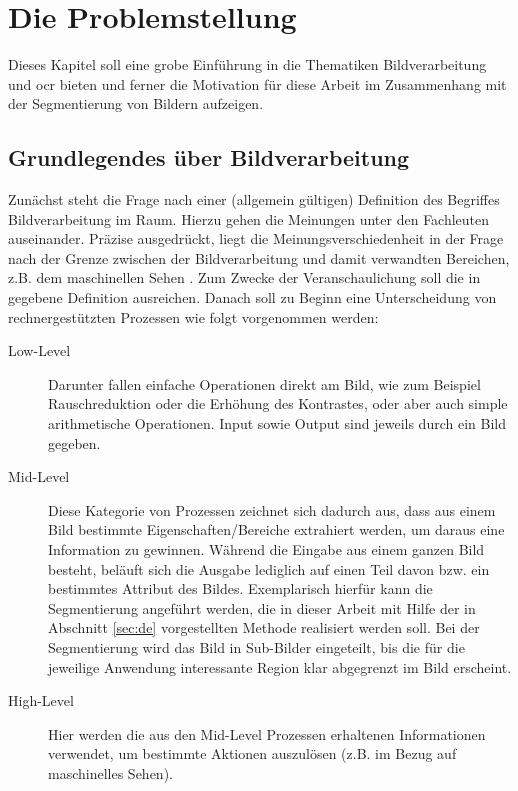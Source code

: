 \chapter{Die Problemstellung}
\label{sec:prob}
	
	Dieses Kapitel soll eine grobe Einführung in die Thematiken Bildverarbeitung und \gls{ocr} bieten und ferner die Motivation für diese Arbeit im Zusammenhang mit der Segmentierung von Bildern aufzeigen.
	\section{Grundlegendes über Bildverarbeitung}
	\label{sec:bild-basics}
	
		Zunächst steht die Frage nach einer (allgemein gültigen) Definition des Begriffes Bildverarbeitung im Raum. Hierzu gehen die Meinungen unter den Fachleuten auseinander. Präzise ausgedrückt, liegt die Meinungsverschiedenheit in der Frage nach der Grenze zwischen der Bildverarbeitung und damit verwandten Bereichen, z.B. dem maschinellen Sehen \cite[S. 2]{gonzalez-woods}. Zum Zwecke der Veranschaulichung soll die in \cite[S. 2]{gonzalez-woods} gegebene Definition ausreichen. Danach soll zu Beginn eine Unterscheidung von rechnergestützten Prozessen wie folgt vorgenommen werden:
		\begin{description}
			\item[Low-Level] Darunter fallen einfache Operationen direkt am Bild, wie zum Beispiel Rauschreduktion oder die Erhöhung des Kontrastes, oder aber auch simple arithmetische Operationen. Input sowie Output sind jeweils durch ein Bild gegeben.
			\item[Mid-Level] Diese Kategorie von Prozessen zeichnet sich dadurch aus, dass aus einem Bild bestimmte Eigenschaften/Bereiche extrahiert werden, um daraus eine Information zu gewinnen. Während die Eingabe aus einem ganzen Bild besteht, beläuft sich die Ausgabe lediglich auf einen Teil davon bzw. ein bestimmtes Attribut des Bildes. Exemplarisch hierfür kann die Segmentierung angeführt werden, die in dieser Arbeit mit Hilfe der in Abschnitt \ref{sec:de} vorgestellten Methode realisiert werden soll. Bei der Segmentierung wird das Bild in Sub-Bilder eingeteilt, bis die für die jeweilige Anwendung interessante Region klar abgegrenzt im Bild erscheint.
			\item[High-Level] Hier werden die aus den Mid-Level Prozessen erhaltenen Informationen verwendet, um bestimmte Aktionen auszulösen (z.B. im Bezug auf maschinelles Sehen).
		\end{description}
